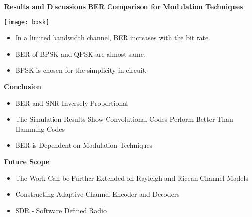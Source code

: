 \documentclass{beamer}
\begin{document}
\begin{frame}{\scriptsize \LARGE \centering \textbf{Results and Discussions}}
\textbf{BER Comparison for Modulation Techniques}
\begin{center}
\texttt{[image: bpsk]}
\end{center}
\begin{itemize}
\item In a limited bandwidth channel, BER increases with the bit rate.
\item BER of BPSK and QPSK are almost same.
\item BPSK is chosen for the simplicity in circuit.
\end{itemize}
\end{frame}

\begin{frame}{\scriptsize \LARGE \centering \textbf{Conclusion}}
\begin{itemize}
\item BER and SNR Inversely Proportional 
\item The Simulation Results Show Convolutional Codes Perform Better Than Hamming Codes
\item BER is Dependent on Modulation Techniques
\end{itemize}
\end{frame}

\begin{frame}{\scriptsize \LARGE \centering \textbf{Future Scope}}
\begin{itemize}
\item The Work Can be Further Extended on Rayleigh and Ricean Channel Models
\item Constructing Adaptive Channel Encoder and Decoders
\item SDR - Software Defined Radio
\end{itemize}
\end{frame}
\end{document}
